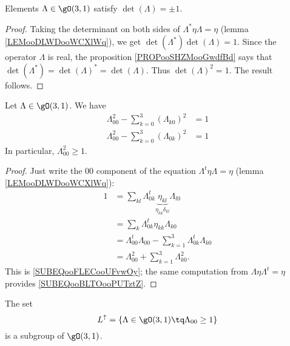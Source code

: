 \begin{lemma}
    Elements \( \Lambda\in\gO(3,1)\) satisfy \( \det(\Lambda)=\pm1\).
\end{lemma}

\begin{proof}
    Taking the determinant on both sides of \( \Lambda^*\eta\Lambda=\eta\) (lemma \ref{LEMooDLWDooWCXlWq}), we get \( \det(\Lambda^*)\det(\Lambda)=1\). Since the operator \( \Lambda\) is real, the proposition \ref{PROPooSHZMooGwdfBd} says that \( \det(\Lambda^*)=\det(\Lambda)^*=\det(\Lambda)\). Thus \( \det(\Lambda)^2=1\). The result follows.
\end{proof}

\begin{lemma}       \label{LEMooHRNXooJOgfpy}
    Let \( \Lambda\in \gO(3,1)\). We have
    \begin{subequations}
        \begin{align}
            \Lambda_{00}^2-\sum_{k=0}^3(\Lambda_{k0})^2&=1      \label{SUBEQooFLECooUFvwOy}\\
            \Lambda_{00}^2-\sum_{k=0}^3(\Lambda_{0k})^2&=1  \label{SUBEQooBLTOooPUTztZ}
        \end{align}
    \end{subequations}
    In particular, \( \Lambda_{00}^2\geq 1\).
\end{lemma}

\begin{proof}
    Just write the \( 00\) component of the equation \( \Lambda^t\eta\Lambda=\eta\) (lemma \ref{LEMooDLWDooWCXlWq}):
    \begin{subequations}
        \begin{align}
            1&=\sum_{kl}\Lambda^t_{0k}\underbrace{\eta_{kl}}_{\eta_{kk}\delta_{kl}}\Lambda_{l0}\\
            &=\sum_k\Lambda_{0k}^t\eta_{kk}\Lambda_{k0}\\
            &=\Lambda_{00}^t\Lambda_{00}-\sum_{k=1}^3\Lambda^t_{0k}\Lambda_{k0}\\
            &=\Lambda_{00}^2+\sum_{k=1}^3\Lambda_{k0}^2.
        \end{align}
    \end{subequations}
    This is \eqref{SUBEQooFLECooUFvwOy}; the same computation from \( \Lambda\eta\Lambda^t=\eta\) provides \eqref{SUBEQooBLTOooPUTztZ}.
\end{proof}

\begin{lemma}
    The set
    \begin{equation}
        L^{\uparrow}=\{ \Lambda\in\gO(3,1)\tq \Lambda_{00}\geq 1 \}
    \end{equation}
    is a subgroup of \( \gO(3,1)\).
\end{lemma}


